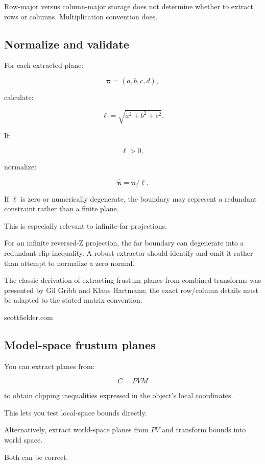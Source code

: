 Row-major versus column-major storage does not determine whether to extract rows or columns. Multiplication convention does.

\subsection{Normalize and validate}\label{02-foundations-ii-ch034-normalize-and-validate}

For each extracted plane:

\[
 \boldsymbol\pi=(a,b,c,d),
\]

calculate:

\[
 \ell=\sqrt{a^2+b^2+c^2}.
\]

If:

\[
 \ell>0,
\]

normalize:

\[
 \boxed{ \hat{\boldsymbol\pi}=\boldsymbol\pi/\ell }.
\]

If \(\ell\) is zero or numerically degenerate, the boundary may represent a redundant constraint rather than a finite plane.

This is especially relevant to infinite-far projections.

For an infinite reversed-Z projection, the far boundary can degenerate into a redundant clip inequality. A robust extractor should identify and omit it rather than attempt to normalize a zero normal.

The classic derivation of extracting frustum planes from combined transforms was presented by Gil Gribb and Klaus Hartmann; the exact row/column details must be adapted to the stated matrix convention. 

scottfielder.com

\subsection{Model-space frustum planes}\label{02-foundations-ii-ch034-model-space-frustum-planes}

You can extract planes from:

\[
 C=PVM
\]

to obtain clipping inequalities expressed in the object's local coordinates.

This lets you test local-space bounds directly.

Alternatively, extract world-space planes from \(PV\) and transform bounds into world space.

Both can be correct.

